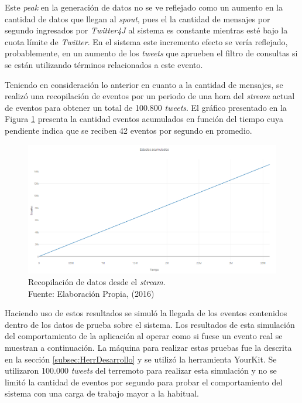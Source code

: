 Este \textit{peak} en la generación de datos no se ve reflejado como un aumento en la cantidad de datos que llegan al \textit{spout}, pues el la cantidad de mensajes por segundo ingresados por \textit{Twitter4J} al sistema es constante mientras esté bajo la cuota límite de \textit{Twitter}. En el sistema este incremento efecto se vería reflejado, probablemente, en un aumento de los \textit{tweets} que aprueben el filtro de consultas si se están utilizando términos relacionados a este evento.

Teniendo en consideración lo anterior en cuanto a la cantidad de mensajes, se realizó una recopilación de eventos por un periodo de una hora del \textit{stream} actual de eventos para obtener un total de 100.800 \textit{tweets}. El gráfico presentado en la Figura \ref{fig:graficoAcumulado} presenta la cantidad eventos acumulados en función del tiempo cuya pendiente indica que se reciben 42 eventos por segundo en promedio.

\begin{figure}[H]
        \centering
        \captionsetup{justification=centering}
        \includegraphics[scale=0.5]{images/DatosAcumulados.png}
        \caption[Recopilación de datos desde el \textit{stream}.]{Recopilación de datos desde el \textit{stream}.\\Fuente: Elaboración Propia, (2016)}
        \label{fig:graficoAcumulado}
\end{figure}

Haciendo uso de estos resultados se simuló la llegada de los eventos contenidos dentro de los datos de prueba sobre el sistema. Los resultados de esta simulación del comportamiento de la aplicación al operar como si fuese un evento real se muestran a continuación. La máquina para realizar estas pruebas fue la descrita en la sección \ref{subsec:HerrDesarrollo} y se utilizó la herramienta YourKit. Se utilizaron 100.000 \textit{tweets} del terremoto para realizar esta simulación y no se limitó la cantidad de eventos por segundo para probar el comportamiento del sistema con una carga de trabajo mayor a la habitual.

